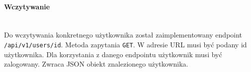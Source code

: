 
% 
\paragraph{Wczytywanie}\mbox{}\\

Do wczytywania konkretnego użytkownika został zaimplementowany endpoint \texttt{/api/v1/users/{id}}.
Metoda zapytania \texttt{GET}.
W adresie URL musi być podany id użytkownika.
Dla korzystania z danego endpointu użytkownik musi być zalogowany.
Zwraca JSON obiekt znalezionego użytkownika.

